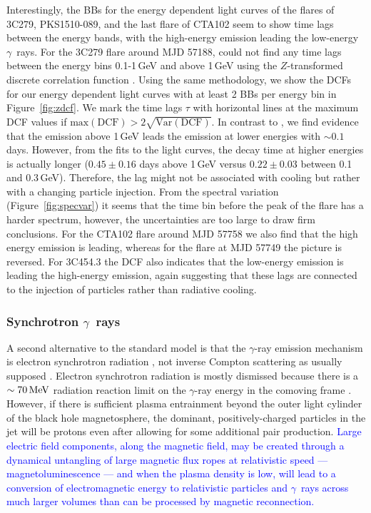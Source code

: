 \documentclass[twocolumn,linenumbers]{aastex62}
\newcommand{\Grays}{$\gamma$~rays\xspace}
\newcommand{\gray}{$\gamma$-ray\xspace}
\newcommand{\response}[1]{\textcolor{blue}{#1}}
\begin{document}
Interestingly, the BBs for the energy dependent light curves of the flares of 3C279, PKS1510-089, and the last flare of CTA102 seem to show time lags between the energy bands, with the high-energy emission leading the low-energy \Grays.
For the 3C279 flare around MJD 57188, \citet{2015ApJ...808L..48P} could not find any time lags between the energy bins 0.1-1\,GeV and above 1\,GeV using the $Z$-transformed discrete correlation function \citep[DCF;][]{1997ASSL..218..163A,2013arXiv1302.1508A}.
Using the same methodology, we show the DCFs for our energy dependent light curves with at least 2 BBs per energy bin in Figure~\ref{fig:zdcf}.
We mark the time lags $\tau$ with horizontal lines at the maximum DCF values if $\mathrm{max}(\mathrm{DCF}) > 2 \sqrt{\mathrm{Var}(\mathrm{DCF})}$.
In contrast to \citet{2015ApJ...808L..48P}, we find evidence that the emission above 1\,GeV leads the emission at lower energies with $\sim 0.1$ days. 
However, from the fits to the light curves, the decay time at higher energies is actually longer ($0.45\pm0.16$ days above 1\,GeV versus $0.22 \pm 0.03$ between 0.1 and 0.3\,GeV). 
Therefore, the lag might not be associated with cooling but rather with a changing particle injection. 
From the spectral variation (Figure~\ref{fig:specvar}) it seems that the time bin before the peak of the flare has a harder spectrum, however, the uncertainties are too large to draw firm conclusions.
For the CTA102 flare around MJD 57758 we also find that the high energy emission is leading, whereas for the flare at MJD 57749 the picture is reversed. 
For 3C454.3 the DCF also indicates that the low-energy emission is leading the high-energy emission, again suggesting that these lags are connected to the injection of particles rather than radiative cooling.

\subsubsection{Synchrotron \Grays}
\label{sec:gammasync}

A second alternative to the standard model is that the \gray emission mechanism is electron synchrotron radiation \citep{TheFermi-LAT:2016dss}, not inverse Compton scattering as usually supposed \citep[e.g.,][]{Madejski:2016oqg}.
Electron synchrotron radiation is mostly dismissed because there is a $\sim70\,{\rm MeV}$ radiation reaction limit on the \gray energy in the comoving frame \citep[e.g.,][]{1975ctf..book.....L,blandford:2017mag}. 
However, if there is sufficient plasma entrainment beyond the outer light cylinder of the black hole magnetosphere, the dominant, positively-charged particles in the jet will be protons even after allowing for some additional pair production. 
\response{
Large electric field components, along the magnetic field, may be created through a dynamical untangling of large magnetic flux ropes at relativistic speed --- magnetoluminescence --- and when the plasma density is low, will lead to a conversion of electromagnetic energy to relativistic particles and \Grays across much larger volumes than can be processed by magnetic reconnection. 
}
\end{document}

